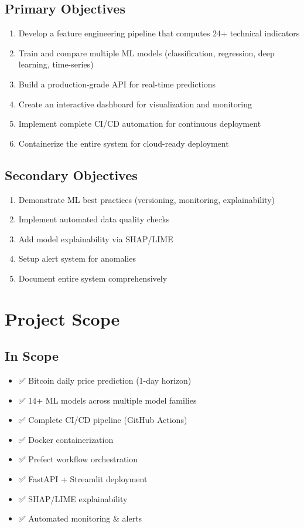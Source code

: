\subsection{Primary Objectives}
\begin{enumerate}
    \item Develop a feature engineering pipeline that computes 24+ technical indicators
    \item Train and compare multiple ML models (classification, regression, deep learning, time-series)
    \item Build a production-grade API for real-time predictions
    \item Create an interactive dashboard for visualization and monitoring
    \item Implement complete CI/CD automation for continuous deployment
    \item Containerize the entire system for cloud-ready deployment
\end{enumerate}

\subsection{Secondary Objectives}
\begin{enumerate}
    \item Demonstrate ML best practices (versioning, monitoring, explainability)
    \item Implement automated data quality checks
    \item Add model explainability via SHAP/LIME
    \item Setup alert system for anomalies
    \item Document entire system comprehensively
\end{enumerate}

\section{Project Scope}

\subsection{In Scope}
\begin{itemize}
    \item ✅ Bitcoin daily price prediction (1-day horizon)
    \item ✅ 14+ ML models across multiple model families
    \item ✅ Complete CI/CD pipeline (GitHub Actions)
    \item ✅ Docker containerization
    \item ✅ Prefect workflow orchestration
    \item ✅ FastAPI + Streamlit deployment
    \item ✅ SHAP/LIME explainability
    \item ✅ Automated monitoring \& alerts
\end{itemize}

